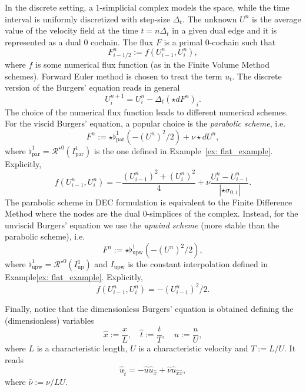 \documentclass{article}
\theoremstyle{definition} %
\theoremstyle{plain} %
\theoremstyle{remark} %
\begin{document}
In the discrete setting, a $1$-simplicial complex models the space, while the time interval is uniformly discretized with step-size $\Delta_t$.
The unknown $U^n$ is the average value of the velocity field at the time $t = n\Delta_t$ in a given dual edge and it is represented as a dual $0$ cochain. The flux $F$ is a primal $0$-cochain such that
\begin{equation*}
	F^n_{i - 1/2} := f(U^n_{i-1}, U^n_i),
\end{equation*}
where $f$ is some numerical flux function (as in the Finite Volume Method schemes). Forward Euler method is chosen to treat the term $u_t$.
The discrete version of the Burgers' equation reads in general 
\begin{equation}
	U^{n+1}_i = U^n_i - \Delta_t(\star dF^n)_i.
\end{equation}
The choice of the numerical flux function leads to different numerical schemes. For the viscid Burgers' equation, a popular choice is the \textsl{parabolic scheme}, i.e.
\begin{equation}
	F^n := \star \flat^1_{\text{par}}(-(U^n)^2/2) + \nu \star d U^n,
\end{equation}
where $\flat^1_{\text{par}} = \mathcal{R}^{\star 0}(I^1_{\text{par}})$ is the one defined in Example~\ref{ex: flat_example}.
Explicitly,
\begin{equation}
	f(U^n_{i-1}, U^n_i) = -\frac{(U^n_{i-1})^2 + (U^n_{i})^2}{4} + \nu \frac{U^n_{i} - U^n_{i-1}}{|\star \sigma_{0,i}|}.
\end{equation}
The parabolic scheme in DEC formulation is equivalent to the Finite Difference Method where the nodes are the dual $0$-simplices of the complex.
Instead, for the unviscid Burgers' equation we use the \textsl{upwind scheme} (more stable than the parabolic scheme), i.e.
\begin{equation}
	F^n := \star \flat^1_{\text{upw}}(-(U^n)^2/2),
\end{equation}
where $\flat^1_{\text{upw}} = \mathcal{R}^{\star 0}(I^1_{\text{up}})$ and $I_{\text{upw}}$ is the constant interpolation defined in Example\ref{ex: flat_example}. Explicitly,
\begin{equation}
	f(U^n_{i-1}, U^n_i) = -(U^n_{i-1})^2/2.
\end{equation}

Finally, notice that the dimensionless Burgers' equation is obtained defining the (dimensionless) variables
\begin{equation}
	\hat{x} := \frac{x}{L}, \quad \hat{t} := \frac{t}{T}, \quad \hat{u} := \frac{u}{U},
\end{equation}
where $L$ is a characteristic length, $U$ is a characteristic velocity and $T := L/U$. It reads
\begin{equation}
	\hat{u}_{\hat{t}} = - \hat{u}\hat{u}_{\hat{x}} + \hat{\nu} \hat{u}_{\hat{x}\hat{x}}, 
\end{equation}
where $\hat{\nu} := \nu/{LU}$.
\end{document}
